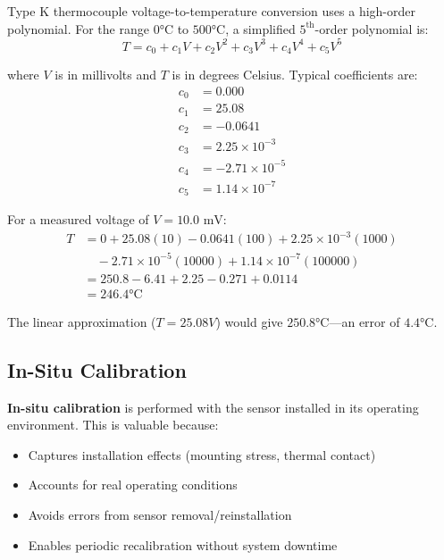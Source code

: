 \begin{example}
\label{ex:thermocouple_cal}

Type K thermocouple voltage-to-temperature conversion uses a high-order polynomial. For the range $0°\text{C}$ to $500°\text{C}$, a simplified $5^{\text{th}}$-order polynomial is:
\begin{equation}
T = c_0 + c_1 V + c_2 V^2 + c_3 V^3 + c_4 V^4 + c_5 V^5
\end{equation}

where $V$ is in millivolts and $T$ is in degrees Celsius. Typical coefficients are:
\begin{align*}
c_0 &= 0.000 \\
c_1 &= 25.08 \\
c_2 &= -0.0641 \\
c_3 &= 2.25 \times 10^{-3} \\
c_4 &= -2.71 \times 10^{-5} \\
c_5 &= 1.14 \times 10^{-7}
\end{align*}

For a measured voltage of $V = 10.0\text{ mV}$:
\begin{align*}
T &= 0 + 25.08(10) - 0.0641(100) + 2.25 \times 10^{-3}(1000) \\
  &\quad - 2.71 \times 10^{-5}(10000) + 1.14 \times 10^{-7}(100000) \\
&= 250.8 - 6.41 + 2.25 - 0.271 + 0.0114 \\
&= 246.4°\text{C}
\end{align*}

The linear approximation ($T = 25.08V$) would give $250.8°\text{C}$---an error of $4.4°\text{C}$.
\end{example}

\subsection{In-Situ Calibration}

\textbf{In-situ calibration} is performed with the sensor installed in its operating environment. This is valuable because:
\begin{itemize}
    \item Captures installation effects (mounting stress, thermal contact)
    \item Accounts for real operating conditions
    \item Avoids errors from sensor removal/reinstallation
    \item Enables periodic recalibration without system downtime
\end{itemize}

